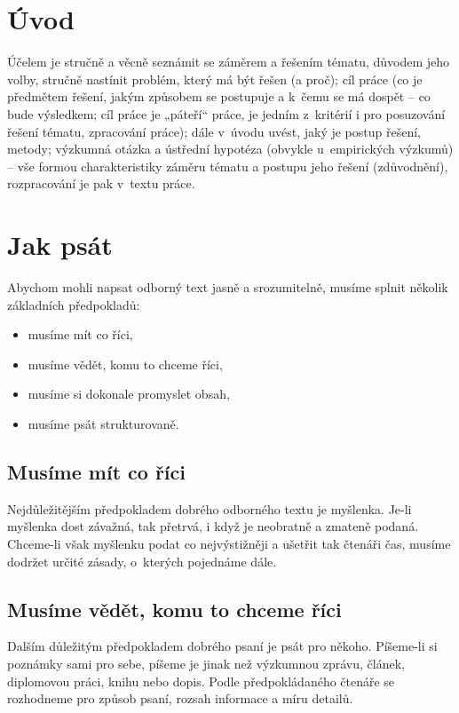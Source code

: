 \documentclass{template/socthesis}
\begin{document}
\chapter*{Úvod}
Účelem je stručně a věcně seznámit se záměrem a řešením tématu, důvodem jeho volby, stručně nastínit problém, který má být řešen (a proč); cíl práce (co je předmětem řešení, jakým způsobem se postupuje a k~čemu se má dospět -- co bude výsledkem; cíl práce je „páteří“ práce, je jedním z~kritérií i pro posuzování řešení tématu, zpracování práce); dále v~úvodu uvést, jaký je postup řešení, metody; výzkumná otázka a ústřední hypotéza (obvykle u~empirických výzkumů) -- vše formou charakteristiky záměru tématu a postupu jeho řešení (zdůvodnění), rozpracování je pak v~textu práce.

\newpage

\chapter{Jak psát}
Abychom mohli napsat odborný text jasně a srozumitelně, musíme splnit několik základních předpokladů\cite{vut-zkousky}:
\begin{itemize}
	\item musíme mít co říci,
	\item musíme vědět, komu to chceme říci,
	\item musíme si dokonale promyslet obsah,
	\item musíme psát strukturovaně.
\end{itemize}

\section{Musíme mít co říci}
Nejdůležitějším předpokladem dobrého odborného textu je myšlenka.
Je-li myšlenka dost závažná, tak přetrvá, i když je neobratně a zmateně podaná.
Chceme-li však myšlenku podat co nejvýstižněji a ušetřit tak čtenáři čas, musíme dodržet určité zásady, o~kterých pojednáme dále.

\section{Musíme vědět, komu to chceme říci}
Dalším důležitým předpokladem dobrého psaní je psát pro někoho.
Píšeme-li si poznámky sami pro sebe, píšeme je jinak než výzkumnou zprávu, článek, diplomovou práci, knihu nebo dopis.
Podle předpokládaného čtenáře se rozhodneme pro způsob psaní, rozsah informace a míru detailů.
\end{document}
